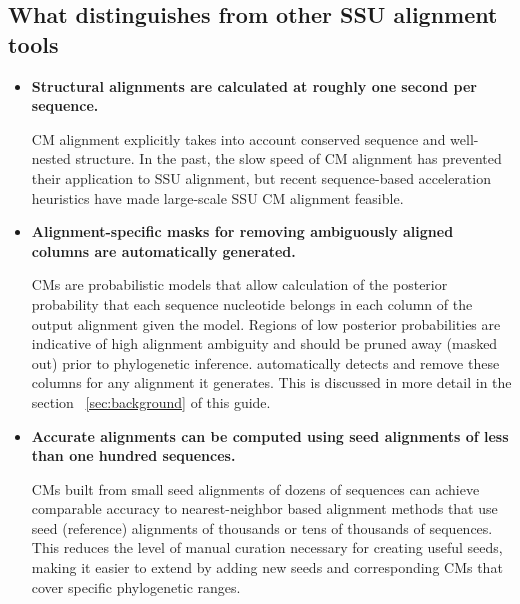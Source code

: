 \subsection{What distinguishes  from other SSU
  alignment tools}


\begin{itemize}

\item \textbf{Structural alignments are calculated at roughly one
  second per sequence.}  

  CM alignment explicitly takes into account conserved sequence and
  well-nested structure. In the past, the slow speed of CM alignment
  has prevented their application to SSU alignment, but recent sequence-based
  acceleration heuristics \cite{Brown00,Nawrocki09b} have 
  made large-scale SSU CM alignment feasible.

\item \textbf{Alignment-specific masks for removing ambiguously aligned columns are
  automatically generated.}
  
  CMs are probabilistic models that allow calculation of the posterior
  probability that each sequence nucleotide belongs in each column of
  the output alignment given the model. Regions of low posterior
  probabilities are indicative of high alignment ambiguity and should
  be pruned away (masked out) prior to phylogenetic
  inference.  automatically detects and remove these
  columns for any alignment it generates. This is discussed in more
  detail in the section ~\ref{sec:background} of this guide.

\item \textbf{Accurate alignments can be computed using seed
  alignments of less than one hundred sequences.}

  CMs built from small seed alignments of dozens of sequences
  can achieve comparable accuracy to nearest-neighbor based alignment
  methods that use seed (reference) alignments of thousands or tens of
  thousands of sequences. This reduces the level of manual curation
  necessary for creating useful seeds, making it easier to extend
   by adding new seeds and corresponding CMs that cover
  specific phylogenetic ranges. 

\end{itemize}



